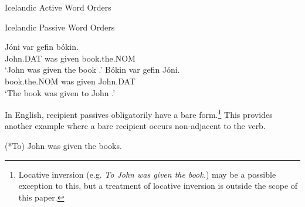 \begin{exe}
\ex Icelandic Active Word Orders
\begin{xlist}
\end{xlist}
\ex Icelandic Passive Word Orders
\begin{xlist}
\ex \gll J\'{o}ni var gefin b\'{o}kin.\\
John.DAT was given book.the.NOM\\
\trans `John was given the book \citep{Holmberg.1995,Bardal.2001}.'
\ex \gll B\'{o}kin var gefin J\'{o}ni.\\
book.the.NOM was given John.DAT\\
\trans `The book was given to John \citep{Holmberg.1995,Bardal.2001}.'
\end{xlist}
\end{exe}

In English, recipient passives obligatorily have a bare form.\footnote{Locative inversion (e.g. \textit{To John was given the book.}) may be a possible exception to this, but a treatment of locative inversion is outside the scope of this paper.} This provides another example where a bare recipient occurs non-adjacent to the verb.

\begin{exe}
\ex (*To) John was given the books.
\end{exe}

